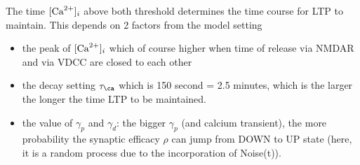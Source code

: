 The time $[{\text{Ca}^{2+}}]_i$ above both threshold determines the time course for LTP to
maintain. This depends on 2 factors from the model setting
\begin{itemize}
  \item the peak of $[{\text{Ca}^{2+}}]_i$ which of course higher when time of release via
  NMDAR and via VDCC are closed to each other
  
  \item the decay setting $\tau_\ca$ which is 150 second = 2.5 minutes, which is
  the larger the longer the time LTP to be maintained.
  
  \item the value of $\gamma_p$ and $\gamma_d$: 
  the bigger $\gamma_p$ (and calcium transient), the more probability the
  synaptic efficacy $\rho$ can jump from DOWN to UP state (here, it is a random
  process due to the incorporation of Noise(t)).
  
  
\end{itemize}
